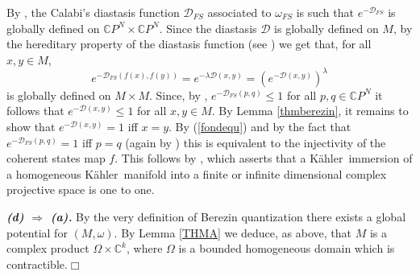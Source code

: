 \documentclass[reqno]{amsart}
\begin{document}
By \cite[Example 6]{LM03}, the
Calabi's diastasis function ${\mathcal{D}}_{{FS}}$ associated to  $\omega_{FS}$ is such that  $e^{-{\mathcal{D}}_{FS}}$
is globally defined on ${\mathbb{C}} P^{N}\times{\mathbb{C}} P^{N}$. Since the diastasis ${\mathcal{D}}$ is globally defined on $M$, by the hereditary property of the diastasis function
 (see \cite[Proposition  6]{calabi}) we get that, for all $x, y\in M$,
\begin{equation}\label{fondequ}
e^{-{\mathcal{D}}_{FS}(f(x), f(y) )}= e^{-\lambda {\mathcal{D}}(x, y)}=\left(e^{- {\mathcal{D}}(x, y)}\right)^{\lambda}
\end{equation}
 is globally defined on $M\times M$.
 Since, by \cite[Example 6]{LM03},   $e^{-{\mathcal{D}}_{FS}(p, q)}\leq 1$ for all $p, q\in {\mathbb{C}} P^{N}$ it follows that $e^{-{\mathcal{D}}(x, y)}\leq 1$ for  all
 $x, y\in M$.
By Lemma \ref{thmberezin}, it remains to show that   $e^{-{\mathcal{D}}(x, y)}=1$ iff $x=y$.  By (\ref{fondequ})   
and by the fact that $e^{-{\mathcal{D}}_{FS}(p, q)}=1$ iff $p=q$ (again by \cite[Example 6]{LM03})
this is equivalent to   the injectivity of the coherent states map  $f$. This follows by \cite[Theorem 3]{dlh}, which asserts that   a   {K\"{a}hler}\ immersion  of a homogeneous {K\"{a}hler}\ manifold into a  finite or infinite dimensional complex projective space is  one to one.

\emph{\bf (d) $\Rightarrow$ (a).} By the very definition of Berezin quantization there exists a global potential for $(M, \omega)$. By Lemma \ref{THMA} we deduce, as above, that $M$ is a complex product $\Omega \times {\mathbb{C}}^k$, where $\Omega$ is a bounded homogeneous domain which is contractible.{\hspace*{\fill}$\Box$}

\vskip 0.5cm
\end{document}
